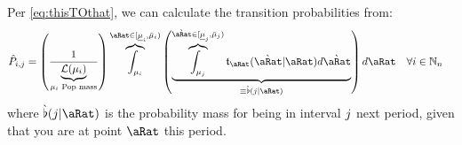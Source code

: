 \documentclass[\econtexRoot/BufferStockTheory.tex]{subfiles}
\begin{document}
Per \eqref{eq:thisTOthat}, we can calculate the transition probabilities from:
\begin{align}
  \TnsMrkv_{\thisBin,\thatBin} &= \left(\frac{1}{\underbrace{\Lebes(\SetPartCnts_{\thisBin})}_{\SetPartCnts_{\thisBin}\text{~Pop mass}}}\right)\overbrace{\int_{\SetPartCnts_{\thisBin}}}^{\pnt\in[\Bot{\SetPartCnts}_{\thisBin},\Top{\SetPartCnts}_{\thisBin})}\left(\underbrace{\overbrace{\int_{\SetPartCnts_{\thatBin}}}^{\Nxt{\pnt}\in[\Bot{\SetPartCnts}_{\thatBin},\Top{\SetPartCnts}_{\thatBin})}\DnsPntNxtFmPntNow_{\pnt}(\Nxt{\pnt}|\pnt){d\Nxt{\pnt}}}_{\equiv \Nxt{\PrbBinNxtFmPntNow}(\thatBin|\pnt)} \right){d\pnt}~~~\forall\thisBin\in\Nteger_{\NumAprxStes} \label{eq:thispTOthatp}
\end{align}
where $\Nxt{\PrbBinNxtFmPntNow}(\thatBin|\pnt)$ is the probability mass for being in interval $j$ next period, given that you are at point $\pnt$ this period.
\end{document}
